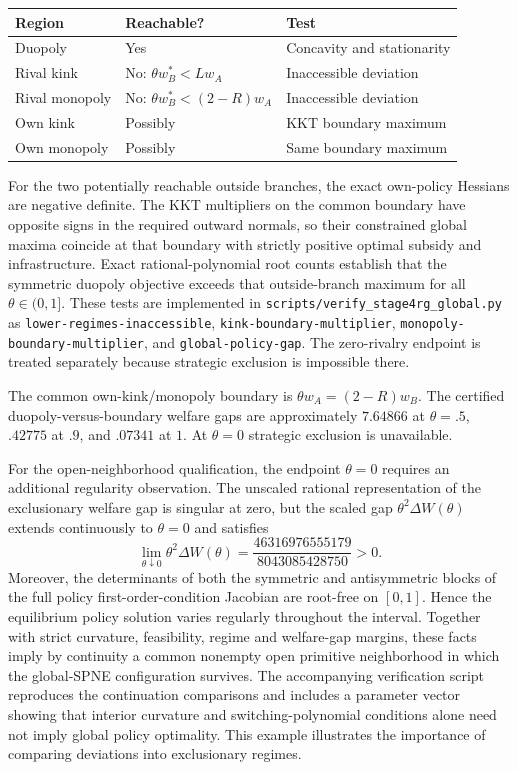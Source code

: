 \begin{center}
\begin{tabular}{@{}lll@{}}
\toprule
Region & Reachable? & Test\\
\midrule
Duopoly & Yes & Concavity and stationarity\\
Rival kink & No: $\theta w_B^*<Lw_A$ & Inaccessible deviation\\
Rival monopoly & No: $\theta w_B^*<(2-R)w_A$ & Inaccessible deviation\\
Own kink & Possibly & KKT boundary maximum\\
Own monopoly & Possibly & Same boundary maximum\\
\bottomrule
\end{tabular}
\end{center}

For the two potentially reachable outside branches, the exact own-policy Hessians are negative definite. The KKT multipliers on the common boundary have opposite signs in the required outward normals, so their constrained global maxima coincide at that boundary with strictly positive optimal subsidy and infrastructure. Exact rational-polynomial root counts establish that the symmetric duopoly objective exceeds that outside-branch maximum for all $\theta\in(0,1]$. These tests are implemented in \texttt{scripts/verify\_stage4rg\_global.py} as \texttt{lower-regimes-inaccessible}, \texttt{kink-boundary-multiplier}, \texttt{monopoly-boundary-multiplier}, and \texttt{global-policy-gap}. The zero-rivalry endpoint is treated separately because strategic exclusion is impossible there.

The common own-kink/monopoly boundary is $\theta w_A=(2-R)w_B$. The certified duopoly-versus-boundary welfare gaps are approximately $7.64866$ at $\theta=.5$, $.42775$ at $.9$, and $.07341$ at $1$. At $\theta=0$ strategic exclusion is unavailable.

For the open-neighborhood qualification, the endpoint $\theta=0$ requires an additional regularity observation. The unscaled rational representation of the exclusionary welfare gap is singular at zero, but the scaled gap $\theta^2\Delta W(\theta)$ extends continuously to $\theta=0$ and satisfies
\[
\lim_{\theta\downarrow0}\theta^2\Delta W(\theta)
=\frac{46316976555179}{8043085428750}>0.
\]
Moreover, the determinants of both the symmetric and antisymmetric blocks of the full policy first-order-condition Jacobian are root-free on $[0,1]$. Hence the equilibrium policy solution varies regularly throughout the interval. Together with strict curvature, feasibility, regime and welfare-gap margins, these facts imply by continuity a common nonempty open primitive neighborhood in which the global-SPNE configuration survives. The accompanying verification script reproduces the continuation comparisons and includes a parameter vector showing that interior curvature and switching-polynomial conditions alone need not imply global policy optimality. This example illustrates the importance of comparing deviations into exclusionary regimes.

